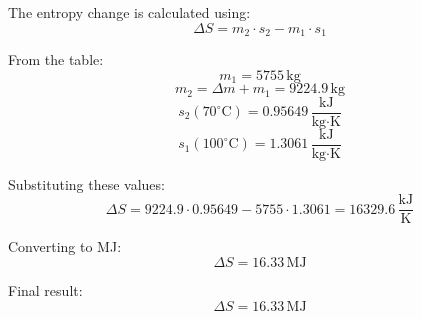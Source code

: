The entropy change is calculated using:  
\[
\Delta S = m_2 \cdot s_2 - m_1 \cdot s_1
\]  

From the table:  
\[
m_1 = 5755 \, \text{kg}
\]  
\[
m_2 = \Delta m + m_1 = 9224.9 \, \text{kg}
\]  
\[
s_2(70^\circ\text{C}) = 0.95649 \, \frac{\text{kJ}}{\text{kg·K}}
\]  
\[
s_1(100^\circ\text{C}) = 1.3061 \, \frac{\text{kJ}}{\text{kg·K}}
\]  

Substituting these values:  
\[
\Delta S = 9224.9 \cdot 0.95649 - 5755 \cdot 1.3061 = 16329.6 \, \frac{\text{kJ}}{\text{K}}
\]  

Converting to MJ:  
\[
\Delta S = 16.33 \, \text{MJ}
\]  

Final result:  
\[
\Delta S = 16.33 \, \text{MJ}
\]